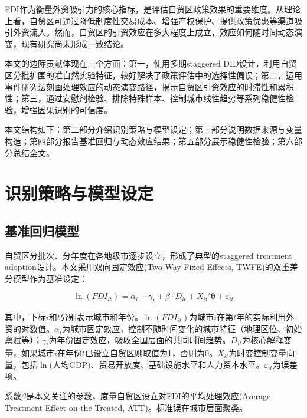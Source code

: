 \documentclass[12pt,a4paper]{article}
\begin{document}
FDI作为衡量外资吸引力的核心指标，是评估自贸区政策效果的重要维度。从理论上看，自贸区可通过降低制度性交易成本、增强产权保护、提供政策优惠等渠道吸引外资流入\citep{jiang2021, wang2023}。然而，自贸区的引资效应在多大程度上成立，效应如何随时间动态演变，现有研究尚未形成一致结论。

本文的边际贡献体现在三个方面：第一，使用多期staggered DID设计，利用自贸区分批扩围的准自然实验特征，较好解决了政策评估中的选择性偏误；第二，运用事件研究法刻画处理效应的动态演变路径，揭示自贸区引资效应的时滞性和累积性；第三，通过安慰剂检验、排除特殊样本、控制城市线性趋势等系列稳健性检验，增强因果识别的可信度。

本文结构如下：第二部分介绍识别策略与模型设定；第三部分说明数据来源与变量构造；第四部分报告基准回归与动态效应结果；第五部分展示稳健性检验；第六部分总结全文。


\section{识别策略与模型设定}
\label{sec:method}

\subsection{基准回归模型}

自贸区分批次、分年度在各地级市逐步设立，形成了典型的staggered treatment adoption设计。本文采用双向固定效应(Two-Way Fixed Effects, TWFE)的双重差分模型作为基准设定：

\begin{equation}
\ln(FDI_{it}) = \alpha_i + \gamma_t + \beta \cdot D_{it} + X_{it}'\boldsymbol{\theta} + \varepsilon_{it}
\label{eq:twfe}
\end{equation}

其中，下标$i$和$t$分别表示城市和年份。$\ln(FDI_{it})$为城市$i$在第$t$年的实际利用外资的对数值。$\alpha_i$为城市固定效应，控制不随时间变化的城市特征（地理区位、初始禀赋等）；$\gamma_t$为年份固定效应，吸收全国层面的共同时间趋势。$D_{it}$为核心解释变量，如果城市$i$在年份$t$已设立自贸区则取值为1，否则为0。$X_{it}$为时变控制变量向量，包括$\ln($人均GDP$)$、贸易开放度、基础设施水平和人力资本水平。$\varepsilon_{it}$为误差项。

系数$\beta$是本文关注的参数，度量自贸区设立对FDI的平均处理效应(Average Treatment Effect on the Treated, ATT)。标准误在城市层面聚类。
\end{document}
